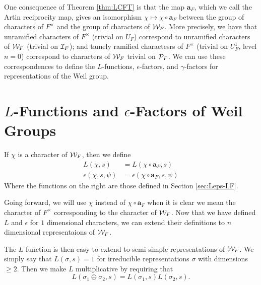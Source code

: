 One consequence of Theorem \ref{thm:LCFT} is that the map $\bm{a}_F$, which we call the Artin reciprocity map, gives an isomorphism $\chi \mapsto \chi \circ \bm{a}_F$ between the group of characters of $F^\times$ and the group of characters of $\mathcal{W}_F$.
More precisely, we have that unramified characters of $F^\times$ (trivial on $U_F$) correspond to unramified characters of $\mathcal{W}_F$ (trivial on $\mathcal{I}_F$); and tamely ramified charactesrs of $F^\times$ (trivial on $U_F^1$, level $n=0$) correspond to characters of $\mathcal{W}_F$ trivial on $\mathcal{P}_F$.
We can use these correspondences to define the $L$-functions, $\epsilon$-factors, and $\gamma$-factors for representations of the Weil group.

\section{$L$-Functions and $\epsilon$-Factors of Weil Groups}

\begin{defn}
  If $\chi$ is a character of $\mathcal{W}_F$, then we define
  \begin{align*}
    L(\chi, s) &= L(\chi \circ \bm{a}_F, s) \\
    \epsilon(\chi, s, \psi) &= \epsilon(\chi \circ \bm{a}_F, s, \psi)
  \end{align*}
  Where the functions on the right are those defined in Section \ref{sec:Leps-LF}.
\end{defn}
Going forward, we will use $\chi$ instead of $\chi \circ \bm{a}_F$ when it is clear we mean the character of $F^\times$ corresponding to the character of $\mathcal{W}_F$.
Now that we have defined $L$ and $\epsilon$ for $1$ dimensional characters, we can extend their definitions to $n$ dimensional representaions of $\mathcal{W}_F$.

The $L$ function is then easy to extend to semi-simple representations of $\mathcal{W}_F$.
We simply say that $L(\sigma,s) = 1$ for irreducible representations $\sigma$ with dimensions $\geq 2$.
Then we make $L$ multiplicative by requiring that
\[L(\sigma_1 \oplus \sigma_2,s) = L(\sigma_1,s)L(\sigma_2,s).\]
\\

